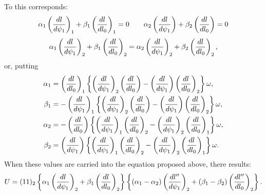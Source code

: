 To this corresponds:
\[
 \alpha_1\left({dl\over d\psi_1}\right)_1+\beta_1\left({dl\over dl_0}\right)_1=0
 \qquad
 \alpha_2\left({dl\over d\psi_1}\right)+\beta_2\left({dl\over dl_0}\right)=0
\]
\[
 \alpha_1\left({dl\over d\psi_1}\right)_2+\beta_1\left({dl\over dl_0}\right)_2
 =\alpha_2\left({dl\over d\psi_1}\right)_2+\beta_2\left({dl\over dl_0}\right)_2,
\]
or, putting
\[
\begin{aligned}
\alpha_1&=\left({dl\over dl_0}\right)_1
\left\{\left({dl\over d\psi_1}\right)_2\left({dl\over dl_0}\right)-\left({dl\over d\psi_1}\right)\left({dl\over dl_0}\right)_2\right\}\omega,\\
\beta_1&=-\left({dl\over d\psi_1}\right)_1
\left\{\left({dl\over d\psi_1}\right)_2\left({dl\over dl_0}\right)-\left({dl\over d\psi_1}\right)\left({dl\over dl_0}\right)_2\right\}\omega,\\
\alpha_2&=-\left({dl\over dl_0}\right)
\left\{\left({dl\over d\psi_1}\right)_1\left({dl\over dl_0}\right)_2-\left({dl\over d\psi_1}\right)_2\left({dl\over dl_0}\right)_1\right\}\omega,\\
\beta_2&=\left({dl\over d\psi_1}\right)
\left\{\left({dl\over d\psi_1}\right)_1\left({dl\over dl_0}\right)_2-\left({dl\over d\psi_1}\right)_2\left({dl\over dl_0}\right)_1\right\}\omega.
\end{aligned}
\]
When these values are carried into the equation proposed above, there results:
\[
 U=(11)_2\left\{\alpha_1\left({dl\over d\psi_1}\right)_2+\beta_1\left({dl\over dl_0}\right)_2\right\}
\left\{(\alpha_1-\alpha_2)\left({dl''\over d\psi_1}\right)_2+(\beta_1-\beta_2)\left({dl''\over dl_0}\right)_2\right\}.
\]
